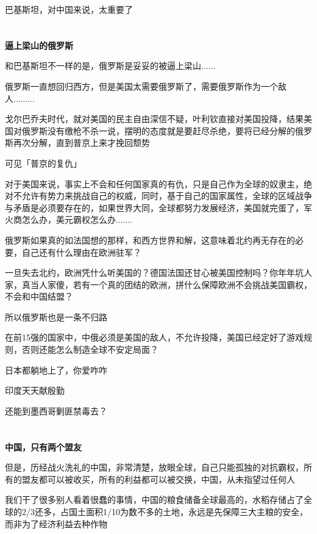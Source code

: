 \documentclass[UTF8, 11pt, oneside]{ctexart}
\newcommand{\zd}[1]{\textbf{\textcolor[RGB]{123,12,0}{#1}}} %
\begin{document}
巴基斯坦，对中国来说，太重要了



\section{}

\zd{逼上梁山的俄罗斯}

和巴基斯坦不一样的是，俄罗斯是妥妥的被逼上梁山......

俄罗斯一直想回归西方，但是美国太需要俄罗斯了，需要俄罗斯作为一个敌人.........

戈尔巴乔夫时代，就对美国的民主自由深信不疑，叶利钦直接对美国投降，结果美国对俄罗斯没有缴枪不杀一说，摆明的态度就是要赶尽杀绝，要将已经分解的俄罗斯再次分解，直到普京上来才挽回颓势

可见「普京的复仇」

对于美国来说，事实上不会和任何国家真的有仇，只是自己作为全球的奴隶主，绝对不允许有势力来挑战自己的权威，同时，基于自己的国家属性，全球的区域战争与矛盾是必须要存在的，如果世界大同，全球都努力发展经济，美国就完蛋了，军火商怎么办，美元霸权怎么办.......

俄罗斯如果真的如法国想的那样，和西方世界和解，这意味着北约再无存在的必要，自己还有什么理由在欧洲驻军？

一旦失去北约，欧洲凭什么听美国的？德国法国还甘心被美国控制吗？你年年坑人家，真当人家傻，若有一个真的团结的欧洲，拼什么保障欧洲不会挑战美国霸权，不会和中国结盟？

所以俄罗斯也是一条不归路

在前15强的国家中，中俄必须是美国的敌人，不允许投降，美国已经定好了游戏规则，否则还能怎么制造全球不安定局面？

日本都躺地上了，你爱咋咋

印度天天献殷勤

还能到墨西哥剿匪禁毒去？



\section{}

\zd{中国，只有两个盟友}

但是，历经战火洗礼的中国，非常清楚，放眼全球，自己只能孤独的对抗霸权，所有的盟友都可以被收买，所有的利益都可以被交换，中国，从未指望过任何人

我们干了很多别人看着很蠢的事情，中国的粮食储备全球最高的，水稻存储占了全球的2/3还多，占国土面积1/10为数不多的土地，永远是先保障三大主粮的安全，而非为了经济利益去种作物
\end{document}
